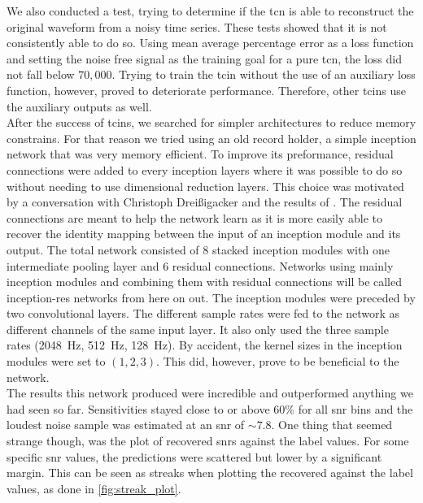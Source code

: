 We also conducted a test, trying to determine if the \gls{tcn} is able to reconstruct the original waveform from a noisy time series. These tests showed that it is not consistently able to do so. Using mean average percentage error as a loss function and setting the noise free signal as the training goal for a pure \gls{tcn}, the loss did not fall below $70,000$. Trying to train the \gls{tcin} without the use of an auxiliary loss function, however, proved to deteriorate performance.
 Therefore, other \gls{tcin}s use the auxiliary outputs as well.\medskip\\
After the success of \gls{tcin}s, we searched for simpler architectures to reduce memory constrains. For that reason we tried using an old record holder, a simple inception network that was very memory efficient. To improve its preformance, residual connections were added to every inception layers where it was possible to do so without needing to use dimensional reduction layers. This choice was motivated by a conversation with Christoph Dreißigacker and the results of \cite{residual_connections_invention}. The residual connections are meant to help the network learn as it is more easily able to recover the identity mapping between the input of an inception module and its output.
 The total network consisted of 8 stacked inception modules with one intermediate pooling layer and 6 residual connections. Networks using mainly inception modules and combining them with residual connections will be called inception-res networks from here on out. The inception modules were preceded by two convolutional layers. The different sample rates were fed to the network as different channels of the same input layer. It also only used the three sample rates (\SI{2048}{\hertz}, \SI{512}{\hertz}, \SI{128}{\hertz}). By accident, the kernel sizes in the inception modules were set to $(1,2,3)$. This did, however, prove to be beneficial to the network.\\
The results this network produced were incredible and outperformed anything we had seen so far. Sensitivities stayed close to or above 60\% for all \gls{snr} bins and the loudest noise sample was estimated at an \gls{snr} of $\sim 7.8$. One thing that seemed strange though, was the plot of recovered \gls{snr}s against the label values. For some specific \gls{snr} values, the predictions were scattered but lower by a significant margin. This can be seen as streaks when plotting the recovered against the label values, as done in \autoref{fig:streak_plot}.\smallskip\\
